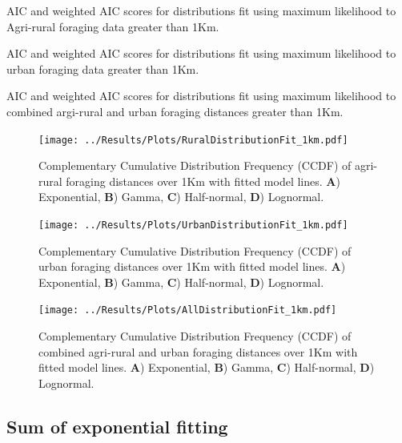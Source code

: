 \documentclass[11pt,usenames,dvipsnames]{article}
\begin{document}
\begin{table}[H]
	\centering
	\caption{AIC and weighted AIC scores for distributions fit using maximum likelihood to Agri-rural foraging data greater than 1Km.}
	
\end{table}
\begin{table}[H]
	\centering
	\caption{AIC and weighted AIC scores for distributions fit using maximum likelihood to urban foraging data greater than 1Km.}
	
\end{table}
\begin{table}[H]
	\centering
	\caption{AIC and weighted AIC scores for distributions fit using maximum likelihood to combined argi-rural and urban foraging distances greater than 1Km.}
	
\end{table}

\begin{figure}[H]
	\centering
	\texttt{[image: ../Results/Plots/RuralDistributionFit\_1km.pdf]}
	\caption{Complementary Cumulative Distribution Frequency (CCDF) of agri-rural foraging distances over 1Km with fitted model lines. \textbf{A}) Exponential, \textbf{B}) Gamma, \textbf{C}) Half-normal, \textbf{D}) Lognormal.}
\end{figure}
\begin{figure}[H]
	\centering
	\texttt{[image: ../Results/Plots/UrbanDistributionFit\_1km.pdf]}
	\caption{Complementary Cumulative Distribution Frequency (CCDF) of urban foraging distances over 1Km with fitted model lines. \textbf{A}) Exponential, \textbf{B}) Gamma, \textbf{C}) Half-normal, \textbf{D}) Lognormal.}
\end{figure}
\begin{figure}[H]
	\centering
	\texttt{[image: ../Results/Plots/AllDistributionFit\_1km.pdf]}
	\caption{Complementary Cumulative Distribution Frequency (CCDF) of combined agri-rural and urban foraging distances over 1Km with fitted model lines. \textbf{A}) Exponential, \textbf{B}) Gamma, \textbf{C}) Half-normal, \textbf{D}) Lognormal.}
\end{figure}

\subsection{Sum of exponential fitting}
\end{document}
